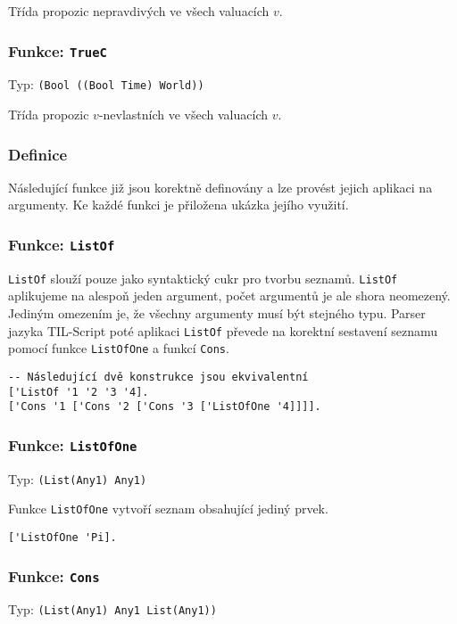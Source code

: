 Třída propozic nepravdivých ve všech valuacích $v$.

\subsubsection*{Funkce: \lstinline|TrueC|}
Typ: \lstinline|(Bool ((Bool Time) World))|

Třída propozic $v$-nevlastních ve všech valuacích $v$.

\subsubsection{Definice}

Následující funkce již jsou korektně definovány a lze provést jejich aplikaci na argumenty. Ke každé
funkci je přiložena ukázka jejího využití.

\subsubsection*{Funkce: \lstinline|ListOf|}

\lstinline{ListOf} slouží pouze jako syntaktický cukr pro tvorbu seznamů. \lstinline{ListOf}
aplikujeme na alespoň jeden argument, počet argumentů je ale shora neomezený. Jediným omezením je,
že všechny argumenty musí být stejného typu. Parser jazyka TIL-Script poté aplikaci
\lstinline{ListOf} převede na korektní sestavení seznamu pomocí funkce \lstinline{ListOfOne} a
funkcí \lstinline{Cons}.


\begin{lstlisting}[caption={Ukázka využití ListOf}]
-- Následující dvě konstrukce jsou ekvivalentní
['ListOf '1 '2 '3 '4].
['Cons '1 ['Cons '2 ['Cons '3 ['ListOfOne '4]]]].
\end{lstlisting}

\subsubsection*{Funkce: \lstinline|ListOfOne|}
Typ: \lstinline{(List(Any1) Any1)}

Funkce \lstinline{ListOfOne} vytvoří seznam obsahující jediný prvek.

\begin{lstlisting}[caption={Ukázka využití ListOfOne}]
['ListOfOne 'Pi].
\end{lstlisting}

\subsubsection*{Funkce: \lstinline|Cons|}
Typ: \lstinline{(List(Any1) Any1 List(Any1))}

